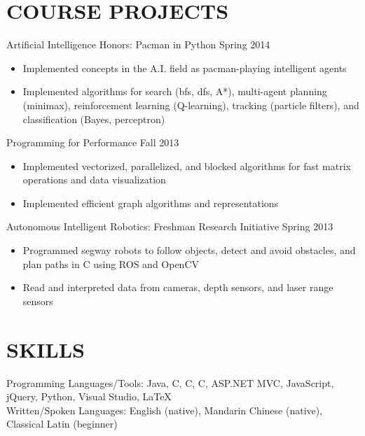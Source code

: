 \documentclass[margin]{res}
\newcommand{\PLUS}{\nolinebreak\hspace{-.05em}\raisebox{.4ex}{\tiny\bf+}}
\newcommand{\CC}{C\PLUS{}\PLUS{}}
\newcommand{\CS}{C\nolinebreak\hspace{-.05em}\raisebox{.4ex}{\scriptsize\bf \#}}
\begin{document}
\begin{resume}
\section{COURSE PROJECTS}

	Artificial Intelligence Honors: Pacman in Python \hfill Spring 2014
	\begin{itemize} \itemsep -2pt
	\item Implemented concepts in the A.I. field as pacman-playing intelligent agents
	\item Implemented algorithms for search (bfs, dfs, A*), multi-agent planning (minimax), reinforcement learning (Q-learning), tracking (particle filters), and classification (Bayes, perceptron)
	\end{itemize}

	Programming for Performance \hfill Fall 2013
	\begin{itemize} \itemsep -2pt
	\item Implemented vectorized, parallelized, and blocked algorithms for fast matrix operations and data visualization
	\item Implemented efficient graph algorithms and representations
	\end{itemize}

	Autonomous Intelligent Robotics: Freshman Research Initiative \hfill Spring 2013
	\begin{itemize} \itemsep -2pt
	\item Programmed segway robots to follow objects, detect and avoid obstacles, and plan paths in \CC{} using ROS and OpenCV
	\item Read and interpreted data from cameras, depth sensors, and laser range sensors
	\end{itemize}

\section{SKILLS}
	Programming Languages/Tools: Java, C, \CC{}, \CS{}, ASP.NET MVC, JavaScript, jQuery, Python, Visual Studio, \LaTeX\\
	Written/Spoken Languages: English (native), Mandarin Chinese (native), Classical Latin (beginner)

\end{resume}
\end{document}
